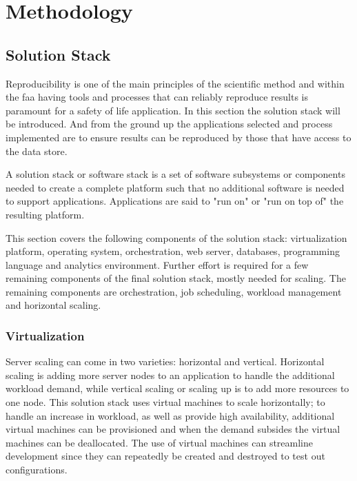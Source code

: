 \chapter{Methodology}
\label{ch:methodology}
\section{Solution Stack}
Reproducibility is one of the main principles of the scientific method and within the \ac{faa} having tools and processes that can reliably reproduce results is paramount for a safety of life application.  In this section the solution stack will be introduced. And from the ground up the applications selected and process implemented are to ensure results can be reproduced by those that have access to the data store.

A solution stack or software stack is a set of software subsystems or components needed to create a complete platform such that no additional software is needed to support applications. Applications are said to "run on" or "run on top of" the resulting platform.

This section covers the following components of the solution stack: virtualization platform, operating system, orchestration, web server, databases, programming language and analytics environment. Further effort is required for a few remaining components of the final solution stack, mostly needed for scaling. The remaining components are orchestration, job scheduling, workload management and horizontal scaling.

\subsection{Virtualization}
Server scaling can come in two varieties: horizontal and vertical.  Horizontal scaling is adding more server nodes to an application to handle the additional workload demand, while vertical scaling or scaling up is to add more resources to one node.  This solution stack uses virtual machines to scale horizontally; to handle an increase in workload, as well as provide high availability, additional virtual machines can be provisioned and when the demand subsides the virtual machines can be deallocated.  The use of virtual machines can streamline development since they can repeatedly be created and destroyed to test out configurations.

